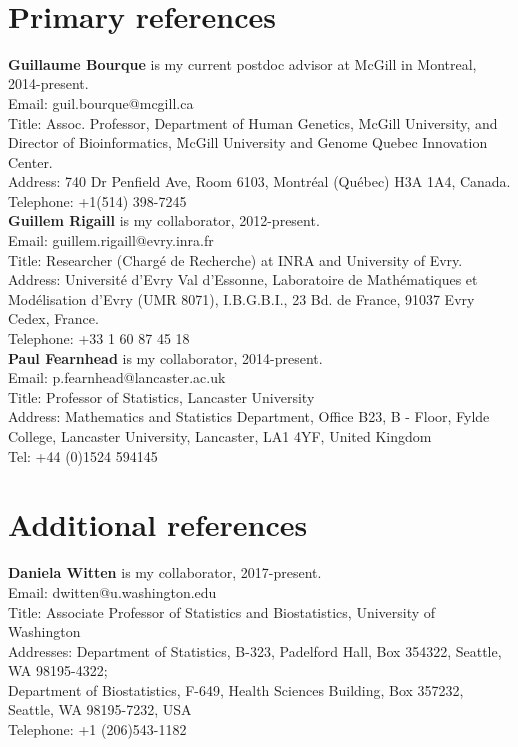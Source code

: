 \documentclass{article}
\begin{document}
\mbox{ }
\setlength{\parindent}{0cm}

\section*{Primary references}

{\bf Guillaume Bourque} is my current postdoc advisor at McGill in Montreal, 2014-present.\\
Email: guil.bourque@mcgill.ca\\
Title: Assoc. Professor, Department of Human Genetics, McGill University, and\\
Director of Bioinformatics, McGill University and Genome Quebec Innovation Center. \\
Address: 740 Dr Penfield Ave, Room 6103, Montréal (Québec) H3A 1A4, Canada.\\
Telephone: +1(514) 398-7245\\

{\bf Guillem Rigaill} is my collaborator, 2012-present.\\
Email: guillem.rigaill@evry.inra.fr\\
Title: Researcher (Charg\'e de Recherche) at INRA and University of Evry.\\
Address: Universit\'e d'Evry Val d'Essonne,
Laboratoire de Math\'ematiques et Mod\'elisation d'Evry (UMR 8071),
I.B.G.B.I., 23 Bd. de France, 91037 Evry Cedex,
France.\\
Telephone: +33 1 60 87 45 18\\

{\bf Paul Fearnhead} is my collaborator, 2014-present.\\
Email: p.fearnhead@lancaster.ac.uk\\
Title: Professor of Statistics, Lancaster University\\
Address: Mathematics and Statistics Department,
Office B23, B - Floor, Fylde College,
Lancaster University,
Lancaster, LA1 4YF,
United Kingdom\\
Tel: +44 (0)1524 594145\\

\section*{Additional references}

{\bf Daniela Witten} is my collaborator, 2017-present.\\
Email: dwitten@u.washington.edu\\
Title: Associate Professor of Statistics and Biostatistics, University of Washington\\
Addresses:
Department of Statistics,
B-323, Padelford Hall, Box 354322,
Seattle, WA 98195-4322;\\
Department of Biostatistics,
F-649, Health Sciences Building, Box 357232,
Seattle, WA 98195-7232,
USA\\
Telephone: +1 (206)543-1182\\
\end{document}
